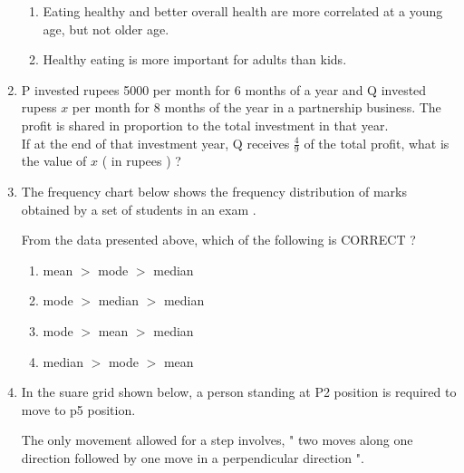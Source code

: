 \documentclass[journal]{IEEEtran}
\begin{document}
\begin{enumerate}
\begin{enumerate}
			\item Eating healthy and better overall health are more correlated at a young age, but not older age.
			\item Healthy eating is more important for adults than kids.
		\end{enumerate}
	\item P invested rupees 5000 per month for 6 months of a year and Q invested rupess $x$ per month for 8 months of the year in a partnership business. The profit is shared in proportion to the total investment in that year. \\
		If at the end of that investment year, Q receives $\frac{4}{9}$ of the total profit, what is the value of $x$ ( in rupees ) ?
		\begin{enumerate}
		\end{enumerate}
	\item The frequency chart below shows the frequency distribution of marks obtained by a set of students in an exam . \\
		\begin{figure}[H]
			\centering
			
			\label{tab: Q_8}
		\end{figure}
		From the data presented above, which of the following is CORRECT ?
		\begin{enumerate}
			\item mean $>$ mode $>$ median
			\item mode $>$ median $>$ median
			\item mode $>$ mean $>$ median
			\item median $>$ mode $>$ mean
		\end{enumerate}
	\item In the suare grid shown below, a person standing at P2 position is required to move to p5 position. \\
		\begin{figure}[H]
			\centering
			
			\label{tab: Q_9}
		\end{figure}
		The only movement allowed for a step involves, " two moves along one direction followed by one move in a perpendicular direction ". %

\end{enumerate}
\end{document}
